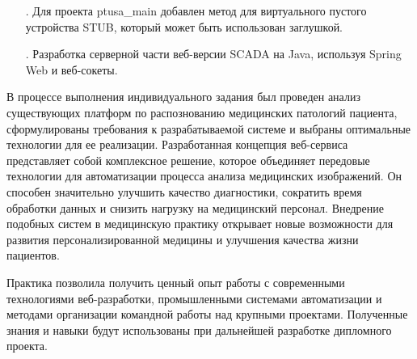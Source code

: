 {\begin{itemize}[leftmargin=2.15cm, labelwidth=0.65cm, labelsep=0.0cm]
		\item[\theitemcntr.] Для проекта ptusa\_main добавлен метод для виртуального пустого устройства STUB, который может быть использован заглушкой. 
		\addtocounter{itemcntr}{1}

		\item[\theitemcntr.] Разработка серверной части веб-версии SCADA на Java, используя Spring Web и веб-сокеты.
		\addtocounter{itemcntr}{1}

	\setcounter{itemcntr}{1}
	\end{itemize}

	\par \redline В процессе выполнения индивидуального задания был проведен анализ существующих платформ по распознованию медицинских патологий пациента, сформулированы требования к разрабатываемой системе и выбраны оптимальные технологии для ее реализации. Разработанная концепция веб-сервиса представляет собой комплексное решение, которое объединяет передовые технологии для автоматизации процесса анализа медицинских изображений. Он способен значительно улучшить качество диагностики, сократить время обработки данных и снизить нагрузку на медицинский персонал. Внедрение подобных систем в медицинскую практику открывает новые возможности для развития персонализированной медицины и улучшения качества жизни пациентов.

	\par \redline Практика позволила получить ценный опыт работы с современными технологиями веб-разработки, промышленными системами автоматизации и методами организации командной работы над крупными проектами. Полученные знания и навыки будут использованы при дальнейшей разработке дипломного проекта.

}

\setcounter{subchaptercntr}{1}
\setcounter{formulacntr}{1}
\setcounter{imagecntr}{1}